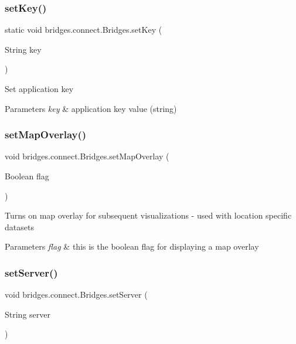 \subsubsection{\texorpdfstring{setKey()}{setKey()}}
{\footnotesize\ttfamily static void bridges.\+connect.\+Bridges.\+set\+Key (\begin{DoxyParamCaption}\item[{String}]{key }\end{DoxyParamCaption})\hspace{0.3cm}{\ttfamily [static]}}

Set application key


\begin{DoxyParams}{Parameters}
{\em key} & application key value (string) \\
\hline
\end{DoxyParams}
\mbox{\label{classbridges_1_1connect_1_1_bridges_a4af383ba2f114ad7bd4e08eb44096973}} 
\subsubsection{\texorpdfstring{setMapOverlay()}{setMapOverlay()}}
{\footnotesize\ttfamily void bridges.\+connect.\+Bridges.\+set\+Map\+Overlay (\begin{DoxyParamCaption}\item[{Boolean}]{flag }\end{DoxyParamCaption})}

Turns on map overlay for subsequent visualizations -\/ used with location specific datasets


\begin{DoxyParams}{Parameters}
{\em flag} & this is the boolean flag for displaying a map overlay \\
\hline
\end{DoxyParams}
\mbox{\label{classbridges_1_1connect_1_1_bridges_ab43e412448e1dfc340e58c407519a576}} 
\subsubsection{\texorpdfstring{setServer()}{setServer()}}
{\footnotesize\ttfamily void bridges.\+connect.\+Bridges.\+set\+Server (\begin{DoxyParamCaption}\item[{String}]{server }\end{DoxyParamCaption})}


